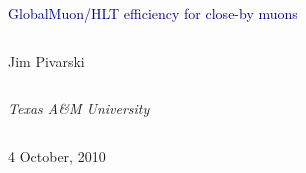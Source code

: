 \documentclass[compress]{beamer}
\begin{document}
\begin{frame}
\vfill
\begin{center}
\textcolor{darkblue}{\Large GlobalMuon/HLT efficiency for close-by muons}

\vfill
\begin{columns}
\begin{center}
\large
Jim Pivarski
\end{center}
\end{columns}

\begin{columns}
\begin{center}
\scriptsize
{\it Texas A\&M University}
\end{center}
\end{columns}

\vfill
 4 October, 2010

\end{center}
\end{frame}


\small



\end{document}
